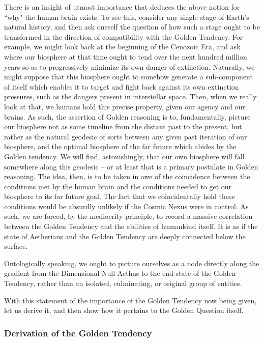 There is an insight of utmost importance that deduces the above notion for ``why" the human brain exists. To see this, consider any single stage of Earth's natural history, and then ask oneself the question of how such a stage ought to be transformed in the direction of compatibility with the Golden Tendency. For example, we might look back at the beginning of the Cenozoic Era, and ask where our biosphere at that time ought to tend over the next hundred million years so as to progressively minimize its own danger of extinction. Naturally, we might suppose that this biosphere ought to somehow generate a sub-component of itself which enables it to target and fight back against its own extinction pressures, such as the dangers present in interstellar space. Then, when we really look at that, we humans hold this precise property, given our agency and our brains. As such, the assertion of Golden reasoning is to, fundamentally, picture our biosphere not as some timeline from the distant past to the present, but rather as the natural geodesic of sorts between any given past iteration of our biosphere, and the optimal biosphere of the far future which abides by the Golden tendency. We will find, astonishingly, that our own biosphere will fall somewhere along this geodesic -- or at least that is a primary postulate in Golden reasoning. The idea, then, is to be taken in awe of the coincidence between the conditions met by the human brain and the conditions needed to get our biosphere to its far future goal. The fact that we coincidentally hold these conditions would be absurdly unlikely if the Cosmic Nexus were in control. As such, we are forced, by the mediocrity principle, to record a massive correlation between the Golden Tendency and the abilities of humankind itself. It is as if the state of Aetherians and the Golden Tendency are deeply connected below the surface. 

\begin{concept}
    Ontologically speaking, we ought to picture ourselves as a node directly along the gradient from the Dimensional Null Aethus to the end-state of the Golden Tendency, rather than an isolated, culminating, or original group of entities. 
\end{concept}

With this statement of the importance of the Golden Tendency now being given, let us derive it, and then show how it pertains to the Golden Question itself.

\subsubsection{Derivation of the Golden Tendency}

